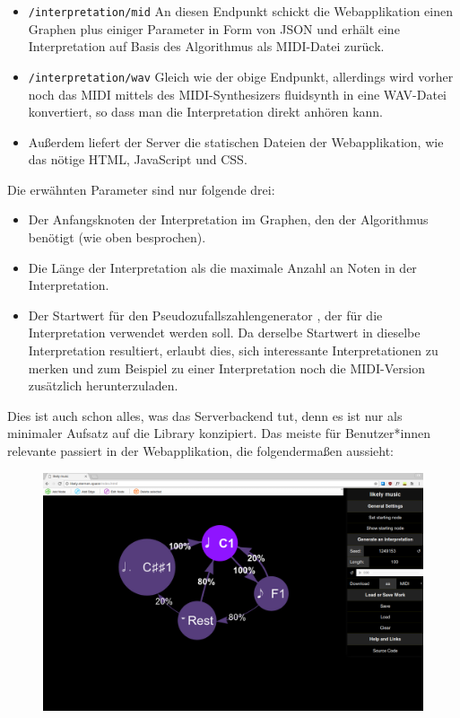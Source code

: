 \documentclass[a4paper,twocolumn]{article}
\begin{document}
\begin{itemize}
  \item \lstinline|/interpretation/mid| An diesen Endpunkt
    schickt die Webapplikation einen Graphen plus einiger Parameter in Form von JSON
    \cite{json} und erhält eine Interpretation auf Basis des Algorithmus als
    MIDI-Datei zurück.
  \item \lstinline|/interpretation/wav| Gleich wie der
    obige Endpunkt, allerdings wird vorher
    noch das MIDI mittels des MIDI-Synthesizers fluidsynth \cite{fluidsynth}
    in eine WAV-Datei konvertiert, so dass man die Interpretation direkt anhören kann.
  \item Außerdem liefert der Server die statischen Dateien der Webapplikation, wie das
    nötige HTML, JavaScript und CSS.
\end{itemize}

Die erwähnten Parameter sind nur folgende drei:

\begin{itemize}
  \item Der Anfangsknoten der Interpretation im Graphen,
    den der Algorithmus benötigt (wie oben besprochen).
  \item Die Länge der Interpretation als die maximale Anzahl an Noten in der
    Interpretation.
  \item Der Startwert für den Pseudozufallszahlengenerator
    \cite{wikipedia_prng}, der für die Interpretation verwendet werden soll.
    Da derselbe Startwert in dieselbe Interpretation resultiert, erlaubt dies,
    sich interessante Interpretationen zu merken und zum Beispiel zu einer
    Interpretation noch die MIDI-Version zusätzlich herunterzuladen.
\end{itemize}

Dies ist auch schon alles, was das Serverbackend tut, denn es ist nur als
minimaler Aufsatz auf die Library konzipiert. Das meiste für Benutzer*innen relevante
passiert in der Webapplikation, die folgendermaßen aussieht:

\begin{figure}[h]
  \includegraphics[width=.5\textwidth]{screenshots/start.png}
\end{figure}
\end{document}
